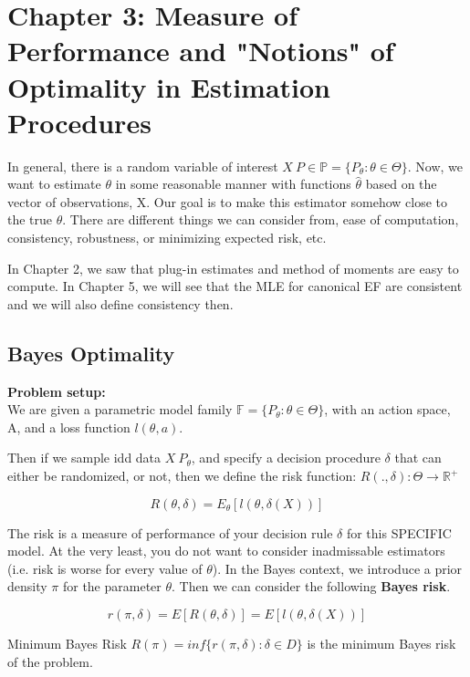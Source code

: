\section{Chapter 3: Measure of Performance and "Notions" of Optimality in Estimation Procedures}
	
	In general, there is a random variable of interest $X ~ P \in \mathbb{P} = \{P_\theta : \theta \in \Theta \}$. Now, we want to estimate $\theta$ in some reasonable manner with functions $\hat{\theta}$ based on the vector of observations, X. Our goal is to make this estimator somehow close to the true $\theta$. There are different things we can consider from, ease of computation, consistency, robustness, or minimizing expected risk, etc.

	In Chapter 2, we saw that plug-in estimates and method of moments are easy to compute. In Chapter 5, we will see that the MLE for canonical EF are consistent and we will also define consistency then.

	\subsection{Bayes Optimality}

		\textbf{Problem setup:}\\
		We are given a parametric model family $\mathbb{F} = \{P_\theta : \theta \in \Theta \}$, with an action space, A, and a loss function $l(\theta, a)$. 

		Then if we sample idd data $X ~ P_\theta$, and specify a decision procedure $\delta$ that can either be randomized, or not, then we define the risk function: $R(., \delta) : \Theta \rightarrow \mathbb{R}^+$

		$$R(\theta, \delta) = E_\theta [ l(\theta, \delta(X)) ]$$

		The risk is a measure of performance of your decision rule $\delta$ for this SPECIFIC model. At the very least, you do not want to consider inadmissable estimators (i.e. risk is worse for every value of $\theta$). In the Bayes context, we introduce a prior density $\pi$ for the parameter $\theta$. Then we can consider the following \textbf{Bayes risk}.

		$$r(\pi, \delta) = E[R(\theta, \delta)] = E[l(\theta, \delta(X))]$$

		\begin{definition}{Minimum Bayes Risk}
			$R(\pi) = inf \{ r(\pi, \delta) : \delta \in D \}$ is the minimum Bayes risk of the problem. 
		\end{definition}

